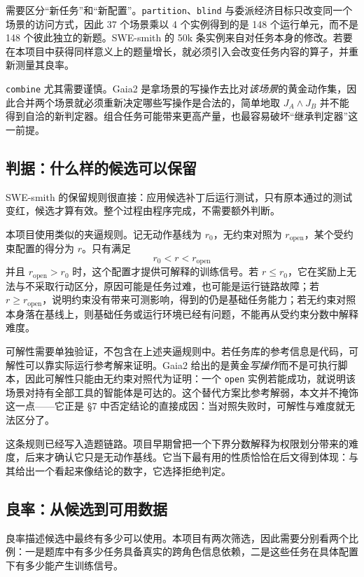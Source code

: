 \documentclass[UTF8,11pt,fontset=fandol]{ctexart}
\begin{document}
需要区分“新任务”和“新配置”。\texttt{partition}、\texttt{blind} 与委派经济目标只改变同一个场景的访问方式，因此 37 个场景乘以 4 个实例得到的是 148 个运行单元，而不是 148 个彼此独立的新题。SWE-smith 的 50k 条实例来自对任务本身的修改。若要在本项目中获得同样意义上的题量增长，就必须引入会改变任务内容的算子，并重新测量其良率。

\texttt{combine} 尤其需要谨慎。Gaia2 是拿场景的写操作去比对\emph{该场景}的黄金动作集，因此合并两个场景就必须重新决定哪些写操作是合法的，简单地取 $J_A\wedge J_B$ 并不能得到自洽的新判定器。组合任务可能带来更高产量，也最容易破坏“继承判定器”这一前提。

\subsection{判据：什么样的候选可以保留}

SWE-smith 的保留规则很直接：应用候选补丁后运行测试，只有原本通过的测试变红，候选才算有效。整个过程由程序完成，不需要额外判断。

本项目使用类似的夹逼规则。记无动作基线为 $r_0$，无约束对照为 $r_{\mathrm{open}}$，某个受约束配置的得分为 $r$。只有满足
\[
  r_0 < r < r_{\mathrm{open}}
\]
并且 $r_{\mathrm{open}}>r_0$ 时，这个配置才提供可解释的训练信号。若 $r\leq r_0$，它在奖励上无法与不采取行动区分，原因可能是任务过难，也可能是运行链路故障；若 $r\geq r_{\mathrm{open}}$，说明约束没有带来可测影响，得到的仍是基础任务能力；若无约束对照本身落在基线上，则基础任务或运行环境已经有问题，不能再从受约束分数中解释难度。

可解性需要单独验证，不包含在上述夹逼规则中。若任务库的参考信息是代码，可解性可以靠实际运行参考解来证明。Gaia2 给出的是黄金\emph{写操作}而不是可执行脚本，因此可解性只能由无约束对照代为证明：一个 \texttt{open} 实例若能成功，就说明该场景对持有全部工具的智能体是可达的。这个替代方案比参考解弱，本文并不掩饰这一点——它正是 \S7 中否定结论的直接成因：当对照失败时，可解性与难度就无法区分了。

这条规则已经写入造题链路。项目早期曾把一个下界分数解释为权限划分带来的难度，后来才确认它只是无动作基线。它当下最有用的性质恰恰在后文得到体现：与其给出一个看起来像结论的数字，它选择拒绝判定。

\subsection{良率：从候选到可用数据}

良率描述候选中最终有多少可以使用。本项目有两次筛选，因此需要分别看两个比例：一是题库中有多少任务具备真实的跨角色信息依赖，二是这些任务在具体配置下有多少能产生训练信号。
\end{document}
